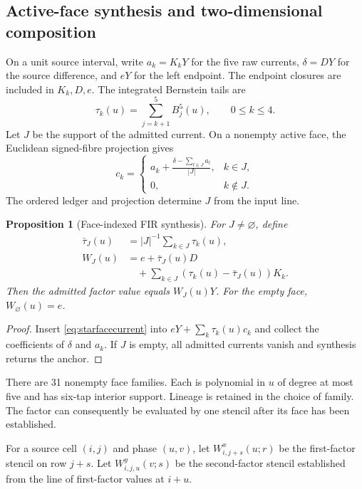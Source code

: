 \documentclass[journal]{IEEEtran}
\newtheorem{proposition}{Proposition}
\begin{document}
\subsection{Active-face synthesis and two-dimensional composition}
On a unit source interval, write $a_k=K_kY$ for the five raw currents,
$\delta=DY$ for the source difference, and $eY$ for the left endpoint.
The endpoint closures are included in $K_k,D,e$. The integrated Bernstein
tails are
\begin{equation}
 \tau_k(u)=\sum_{j=k+1}^{5}B_j^5(u),\qquad 0\leq k\leq4.
\end{equation}
Let $J$ be the support of the admitted current. On a nonempty active face,
the Euclidean signed-fibre projection gives
\begin{equation}
 c_k=\begin{cases}
 a_k+\displaystyle\frac{\delta-\sum_{l\in J}a_l}{|J|},&k\in J,\\
 0,&k\notin J.
 \end{cases}
 \label{eq:starfacecurrent}
\end{equation}
The ordered ledger and projection determine $J$ from the input line.

\begin{proposition}[Face-indexed FIR synthesis]
For $J\ne\varnothing$, define
\begin{align}
 \bar\tau_J(u)&=|J|^{-1}\sum_{k\in J}\tau_k(u),\nonumber\\
 W_J(u)&=e+\bar\tau_J(u)D\nonumber\\
 &\quad+\sum_{k\in J}(\tau_k(u)-\bar\tau_J(u))K_k.
 \label{eq:starfacefir}
\end{align}
Then the admitted factor value equals $W_J(u)Y$. For the empty face,
$W_\varnothing(u)=e$.
\end{proposition}
\begin{proof}
Insert \eqref{eq:starfacecurrent} into $eY+\sum_k\tau_k(u)c_k$ and collect
the coefficients of $\delta$ and $a_k$. If $J$ is empty, all admitted
currents vanish and synthesis returns the anchor.
\end{proof}

There are 31 nonempty face families. Each is polynomial in $u$ of degree at
most five and has six-tap interior support. Lineage is retained in the choice
of family. The factor can consequently be evaluated by one stencil after
its face has been established.

For a source cell $(i,j)$ and phase $(u,v)$, let
$W^x_{i,j+s}(u;r)$ be the first-factor stencil on row $j+s$.
Let $W^y_{i,j,u}(v;s)$ be the second-factor stencil established from the line
of first-factor values at $i+u$.
\end{document}
